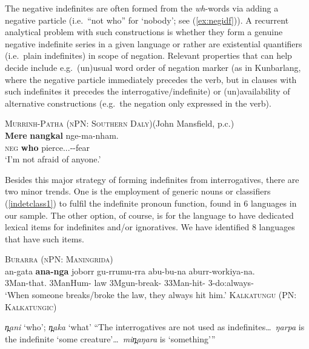 \documentclass[12pt,egregdoesnotlikesansseriftitles]{scrartcl}
\begin{document}
The negative indefinites are often formed from the \textit{wh}-words via adding a negative particle (i.e.\ ``not who'' for `nobody'; see (\ref{ex:negidf})). A recurrent analytical problem with such constructions is whether they form a genuine negative indefinite series in a given language or rather are existential quantifiers (i.e.\ plain indefinites) in scope of negation. %
Relevant properties that can help decide include e.g.\ (un)usual word order of negation marker (as in Kunbarlang, where the negative particle immediately precedes the verb, but in clauses with such indefinites it precedes the interrogative/indefinite) or (un)availability of alternative constructions (e.g.\ the negation only expressed in the verb).
\begin{exe}
  \ex\label{ex:negidf} \textsc{Murrinh-Patha (nPN: Southern Daly)}\hfill (John Mansfield, p.c.)\\
  \gll \textbf{Mere} \textbf{nangkal} nge-ma-nham.\\
  \textsc{neg}  \textbf{who}      pierce.\Rr.\Fsg.\Irr-\Appl-fear\\
  \glt `I'm not afraid of anyone.' %
\end{exe}

Besides this major strategy of forming indefinites from interrogatives, there are two minor trends. One is the employment of generic nouns or classifiers (\ref{indetclass1}) to fulfil the indefinite pronoun function, found in 6 languages in our sample. %
The other option, of course, is for the language to have dedicated lexical items for indefinites and/or ignoratives. We have identified 8 languages that have such items.
\begin{exe}
  \ex\label{indetclass1} \textsc{Burarra (nPN: Maningrida)}\hfill {}\\
  \gll   an-gata    \textbf{ana-nga}            joborr    gu-rrumu-rra  abu-bu-na            aburr-workiya-na.\\
  3Man-that.\Rcgn{}   3ManHum-\Indet{}   law     3Mgun-break-\Pc{}  3\Aug3Man-hit-\Pc{}    3\Auo-do:always-\Pc\\
  \glt %
  `When someone breaks/broke the law, they always hit him.'
  \ex \textsc{Kalkatungu (PN: Kalkatungic)}\hfill {}
  \begin{xlist}
    \ex \textit{\charis n̪ani} `who'; \textit{\charis n̪aka} `what'
    \ex ``The interrogatives are not used as indefinites\ldots\ \textit{\charis ŋarpa} is the indefinite `some creature'\ldots\ \textit{\charis min̪aŋara} is `something'\thinspace''
  \end{xlist}
\end{exe}
\end{document}
